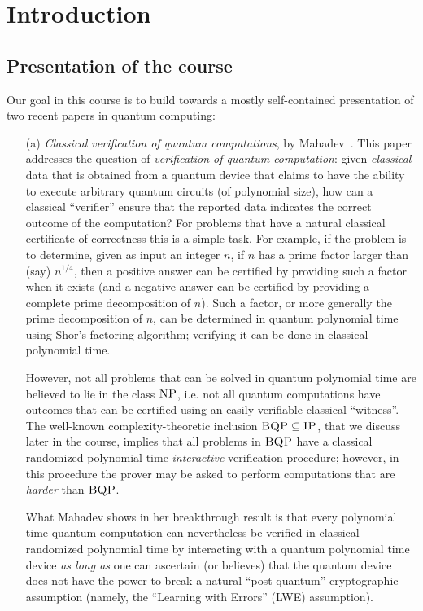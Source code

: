 \chapter{Introduction}

\section{Presentation of the course}

Our goal in this course is to build towards a mostly self-contained presentation of two recent papers in quantum computing: 
\begin{itemize}
\item[(a)] \emph{Classical verification of quantum computations}, by Mahadev~\cite{mahadev2018classical}. This paper addresses the question of \emph{verification of quantum computation}: given \emph{classical} data that is obtained from a quantum device that claims to have the ability to execute arbitrary quantum circuits (of polynomial size), how can a classical ``verifier'' ensure that the reported data indicates the correct outcome of the computation? For problems that have a natural classical certificate of correctness this is a simple task. For example, if the problem is to determine, given as input an integer $n$, if $n$ has a prime factor larger than (say) $n^{1/4}$, then a positive answer can be certified by providing such a factor when it exists (and a negative answer can be certified by providing a complete prime decomposition of $n$). Such a factor, or more generally the prime decomposition of $n$, can be determined in quantum polynomial time using Shor's factoring algorithm; verifying it can be done in classical polynomial time. 

However, not all problems that can be solved in quantum polynomial time are believed to lie in the class $\textsc{NP}$, i.e. not all quantum computations have outcomes that can be certified using an easily verifiable classical ``witness''. The well-known complexity-theoretic inclusion $\textsc{BQP} \subseteq \textsc{IP}$, that we discuss later in the course, implies that all problems in $\textsc{BQP}$ have a classical randomized polynomial-time \emph{interactive} verification procedure; however, in this procedure the prover may be asked to perform computations that are \emph{harder} than $\textsc{BQP}$. 

What Mahadev shows in her breakthrough result is that every polynomial time quantum computation can nevertheless be verified in classical randomized polynomial time by interacting with a quantum polynomial time device \emph{as long as} one can ascertain (or believes)  that the quantum device does not have the power to break  a natural ``post-quantum'' cryptographic assumption (namely, the ``Learning with Errors'' (LWE) assumption). 


\end{itemize}
